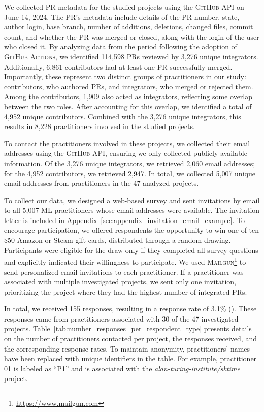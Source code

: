 We collected PR metadata for the studied projects using the \textsc{GitHub API} on June 14, 2024. 
The PR's metadata include details of the PR number, state, author login, base branch, number of additions, deletions, changed files, commit count, and whether the PR was merged or closed, along with the login of the user who closed it.
By analyzing data from the period following the adoption of \textsc{GitHub Actions}, we identified 114,598 PRs reviewed by 3,276 unique integrators. Additionally, 6,861 contributors had at least one PR successfully merged. Importantly, these represent two distinct groups of practitioners in our study: contributors, who authored PRs, and integrators, who merged or rejected them. Among the contributors, 1,909 also acted as integrators, reflecting some overlap between the two roles. After accounting for this overlap, we identified a total of 4,952 unique contributors. Combined with the 3,276 unique integrators, this results in 8,228 practitioners involved in the studied projects.

To contact the practitioners involved in these projects, we collected their email addresses using the \textsc{GitHub API}, ensuring we only collected publicly available information. Of the 3,276 unique integrators, we retrieved 2,060 email addresses; for the 4,952 contributors, we retrieved 2,947. In total, we collected 5,007 unique email addresses from practitioners in the 47 analyzed projects.

To collect our data, we designed a web-based survey and sent invitations by email to all 5,007 ML practitioners whose email addresses were available.
The invitation letter is included in Appendix~\ref{sec:appendix_invitation_email_example}. To encourage participation, we offered respondents the opportunity to win one of ten \$50 Amazon or Steam gift cards, distributed through a random drawing. Participants were eligible for the draw only if they completed all survey questions and explicitly indicated their willingness to participate.
We used \textsc{Mailgun}\footnote{\url{https://www.mailgun.com}} to send personalized email invitations to each practitioner.
If a practitioner was associated with multiple investigated projects, we sent only one invitation, prioritizing the project where they had the highest number of integrated PRs.

In total, we received 155 responses, resulting in a response rate of 3.1\% (). These responses came from practitioners associated with 30 of the 47 investigated projects. Table~\ref{tab:number_responses_per_respondent_type} presents details on the number of practitioners contacted per project, the responses received, and the corresponding response rates. To maintain anonymity, practitioners' names have been replaced with unique identifiers in the table. For example, practitioner 01 is labeled as ``P1'' and is associated with the \textit{alan-turing-institute/sktime} project.

